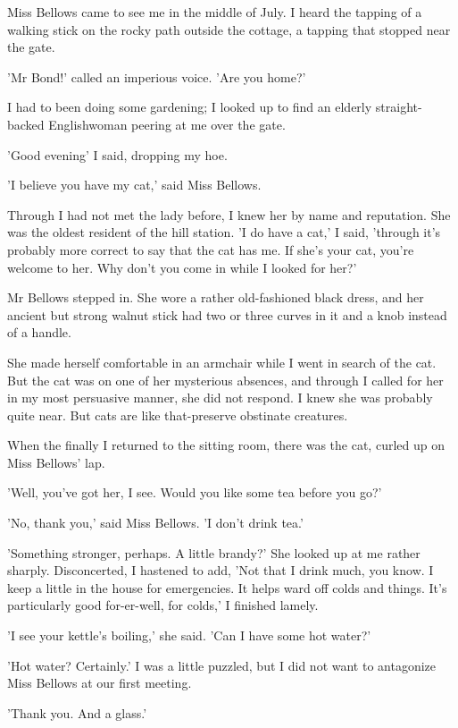 \par
Miss Bellows came to see me in the middle of July. I heard the tapping of a walking stick on the rocky path outside the cottage, a tapping that stopped near the gate.
\par
'Mr Bond!' called an imperious voice. 'Are you home?'
\par
I had to been doing some gardening; I looked up to find an elderly straight-backed Englishwoman peering at me over the gate.
\par
'Good evening' I said, dropping my hoe.
\par
'I believe you have my cat,' said Miss Bellows.
\par
Through I had not met the lady before, I knew her by name and reputation. She was the oldest resident of the hill station.
'I do have a cat,' I said, 'through it's probably more correct to say that the cat has me. If she's your cat, you're welcome to her. Why don't you come in while I looked for her?'
\par
Mr Bellows stepped in. She wore a rather old-fashioned black dress, and her ancient but strong walnut stick had two or three curves in it and a knob instead of a handle.
\par
She made herself comfortable in an armchair while I went in search of the cat. But the cat was on one of her mysterious absences, and through I called for her in my most persuasive manner, she did not respond. I knew she was probably quite near. But cats are like that-preserve obstinate creatures.
\par
When the finally I returned to the sitting room, there was the cat, curled up on Miss Bellows' lap.
\par
'Well, you've got her, I see. Would you like some tea before you go?'
\par
'No, thank you,' said Miss Bellows. 'I don't drink tea.'
\par
'Something stronger, perhaps. A little brandy?' She looked up at me rather sharply. Disconcerted, I hastened to add, 'Not that I drink much, you know. I keep a little in the house for emergencies. It helps ward off colds and things. It's particularly good for-er-well, for colds,' I finished lamely.
\par
'I see your kettle's boiling,' she said. 'Can I have some hot water?'
\par
'Hot water? Certainly.' I was a little puzzled, but I did not want to antagonize Miss Bellows at our first meeting.
\par
'Thank you. And a glass.'
